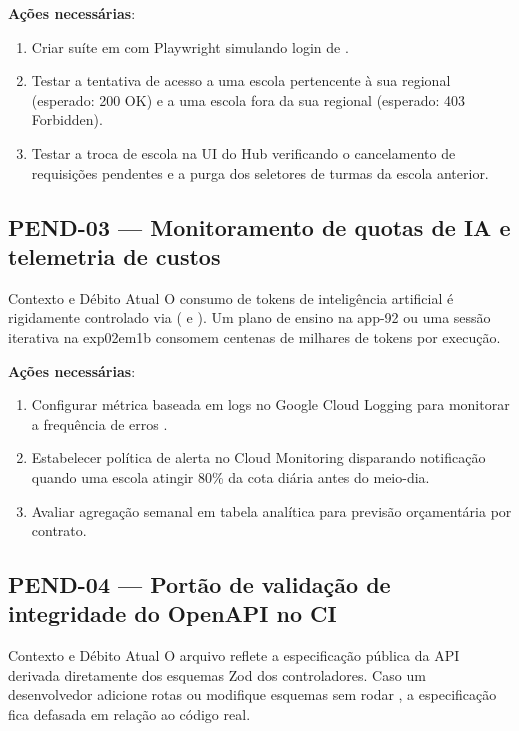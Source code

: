 \textbf{Ações necessárias}:
\begin{enumerate}
  \item Criar suíte em  com Playwright simulando login de
    .
  \item Testar a tentativa de acesso a uma escola pertencente à sua regional
    (esperado: 200 OK) e a uma escola fora da sua regional (esperado: 403 Forbidden).
  \item Testar a troca de escola na UI do Hub verificando o cancelamento de requisições
    pendentes e a purga dos seletores de turmas da escola anterior.
\end{enumerate}

\subsection{PEND-03 — Monitoramento de quotas de IA e telemetria de custos}

\begin{especificacao}{Contexto e Débito Atual}
O consumo de tokens de inteligência artificial é rigidamente controlado via
 ( e ). Um plano de ensino na app-92 ou
uma sessão iterativa na exp02em1b consomem centenas de milhares de tokens por execução.
\end{especificacao}

\textbf{Ações necessárias}:
\begin{enumerate}
  \item Configurar métrica baseada em logs no Google Cloud Logging para monitorar a
    frequência de erros .
  \item Estabelecer política de alerta no Cloud Monitoring disparando notificação
    quando uma escola atingir 80\% da cota diária antes do meio-dia.
  \item Avaliar agregação semanal em tabela analítica para previsão orçamentária por
    contrato.
\end{enumerate}

\subsection{PEND-04 — Portão de validação de integridade do OpenAPI no CI}

\begin{especificacao}{Contexto e Débito Atual}
O arquivo  reflete a especificação pública da API derivada
diretamente dos esquemas Zod dos controladores. Caso um desenvolvedor adicione rotas
ou modifique esquemas sem rodar , a especificação fica
defasada em relação ao código real.
\end{especificacao}

